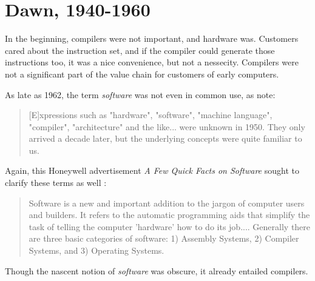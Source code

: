 \chapter{Dawn, 1940-1960}

In the beginning, compilers were not important, and hardware was.
Customers cared about the instruction set,
and if the compiler could generate those instructions too,
it was a nice convenience, but not a nessecity.
Compilers were not a significant part of the value chain for customers of early computers.

As late as 1962, the term \textit{software} was not even in common use, as \citeauthor{the_first_computers_2002} note\cite{the_first_computers_2002}:

\begin{quotation}
[E]xpressions such as "hardware", "software", "machine language", "compiler",
"architecture" and the like... were unknown in 1950. They only arrived a decade
later, but the underlying concepts were quite familiar to us.
\end{quotation}

Again, this Honeywell advertisement \textit{A Few Quick Facts on Software} sought to clarify these terms as well \cite[ch.5]{new_history_of_modern_computing}:

\begin{quotation}
Software is a new and important addition to the jargon of computer users and builders.
It refers to the automatic programming aids that simplify the task of telling the computer 'hardware' how to do its job....
Generally there are three basic categories of software:
1) Assembly Systems, 2) Compiler Systems, and 3) Operating Systems.
\end{quotation}

Though the nascent notion of \textit{software} was obscure, it already entailed compilers.

\vspace{4em}



\vspace{4em}
